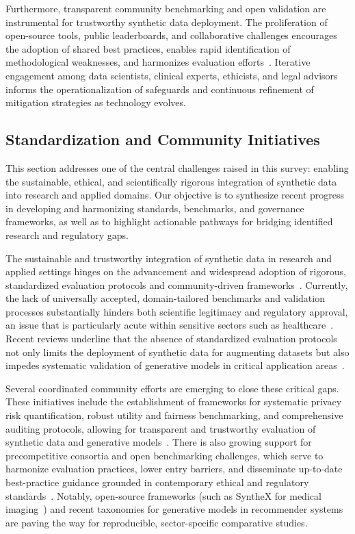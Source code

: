 \documentclass[sigconf]{acmart}
\begin{document}
Furthermore, transparent community benchmarking and open validation are instrumental for trustworthy synthetic data deployment. The proliferation of open-source tools, public leaderboards, and collaborative challenges encourages the adoption of shared best practices, enables rapid identification of methodological weaknesses, and harmonizes evaluation efforts~\cite{ref82}\cite{ref88}\cite{ref89}. Iterative engagement among data scientists, clinical experts, ethicists, and legal advisors informs the operationalization of safeguards and continuous refinement of mitigation strategies as technology evolves.

\subsection{Standardization and Community Initiatives}

This section addresses one of the central challenges raised in this survey: enabling the sustainable, ethical, and scientifically rigorous integration of synthetic data into research and applied domains. Our objective is to synthesize recent progress in developing and harmonizing standards, benchmarks, and governance frameworks, as well as to highlight actionable pathways for bridging identified research and regulatory gaps.

The sustainable and trustworthy integration of synthetic data in research and applied settings hinges on the advancement and widespread adoption of rigorous, standardized evaluation protocols and community-driven frameworks~\cite{ref88,ref89}. Currently, the lack of universally accepted, domain-tailored benchmarks and validation processes substantially hinders both scientific legitimacy and regulatory approval, an issue that is particularly acute within sensitive sectors such as healthcare~\cite{ref6,ref7,ref88,ref89}. Recent reviews underline that the absence of standardized evaluation protocols not only limits the deployment of synthetic data for augmenting datasets but also impedes systematic validation of generative models in critical application areas~\cite{ref89}.

Several coordinated community efforts are emerging to close these critical gaps. These initiatives include the establishment of frameworks for systematic privacy risk quantification, robust utility and fairness benchmarking, and comprehensive auditing protocols, allowing for transparent and trustworthy evaluation of synthetic data and generative models~\cite{ref81,ref82,ref88,ref89}. There is also growing support for precompetitive consortia and open benchmarking challenges, which serve to harmonize evaluation practices, lower entry barriers, and disseminate up-to-date best-practice guidance grounded in contemporary ethical and regulatory standards~\cite{ref89}. Notably, open-source frameworks (such as SyntheX for medical imaging~\cite{ref81}) and recent taxonomies for generative models in recommender systems~\cite{ref75} are paving the way for reproducible, sector-specific comparative studies.
\end{document}
